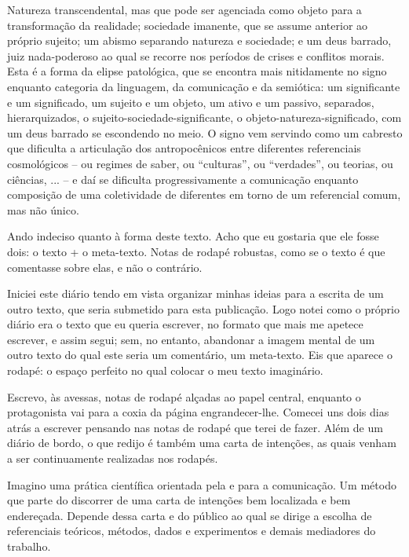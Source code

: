 Natureza transcendental, mas que pode ser agenciada como objeto para a transformação da realidade; sociedade imanente, que se assume anterior ao próprio sujeito; um abismo separando natureza e sociedade; e um deus barrado, juiz nada-poderoso ao qual se recorre nos períodos de crises e conflitos morais. Esta é a forma da elipse patológica, que se encontra mais nitidamente no signo enquanto categoria da linguagem, da comunicação e da semiótica: um significante e um significado, um sujeito e um objeto, um ativo e um passivo, separados, hierarquizados, o sujeito-sociedade-significante, o objeto-natureza-significado, com um deus barrado se escondendo no meio. O signo vem servindo como um cabresto que dificulta a articulação dos antropocênicos entre diferentes referenciais cosmológicos -- ou regimes de saber, ou \enquote{culturas}, ou \enquote{verdades}, ou teorias, ou ciências, ... -- e daí se dificulta progressivamente a comunicação enquanto composição de uma coletividade de diferentes em torno de um referencial comum, mas não único.


Ando indeciso quanto à forma deste texto. Acho que eu gostaria que ele fosse dois: o texto + o meta-texto. Notas de rodapé robustas, como se o texto é que comentasse sobre elas, e não o contrário.

Iniciei este diário tendo em vista organizar minhas ideias para a escrita de um outro texto, que seria submetido para esta publicação. Logo notei como o próprio diário era o texto que eu queria escrever, no formato que mais me apetece escrever, e assim segui; sem, no entanto, abandonar a imagem mental de um outro texto do qual este seria um comentário, um meta-texto. Eis que aparece o rodapé: o espaço perfeito no qual colocar o meu texto imaginário.

Escrevo, às avessas, notas de rodapé alçadas ao papel central, enquanto o protagonista vai para a coxia da página engrandecer-lhe. Comecei uns dois dias atrás a escrever pensando nas notas de rodapé que terei de fazer. Além de um diário de bordo, o que redijo é também uma carta de intenções, as quais venham a ser continuamente realizadas nos rodapés.

Imagino uma prática científica orientada pela e para a comunicação. Um método que parte do discorrer de uma carta de intenções bem localizada e bem endereçada. Depende dessa carta e do público ao qual se dirige a escolha de referenciais teóricos, métodos, dados e experimentos e demais mediadores do trabalho.

